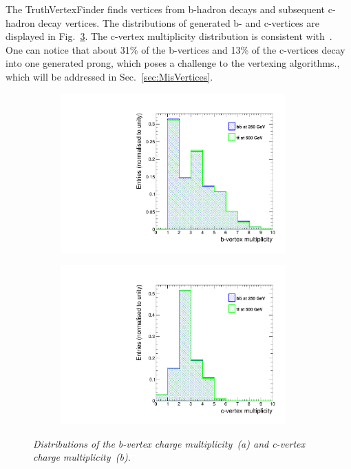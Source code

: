 The TruthVertexFinder finds vertices from b-hadron decays and subsequent c-hadron decay vertices. The distributions of generated b- and c-vertices are displayed in Fig.~\ref{fig:GenVtx_3}. The c-vertex multiplicity distribution is consistent with~\cite{bib:PDG}. One can notice that about 31\% of the b-vertices and 13\% of the c-vertices decay into one generated prong, which poses a challenge to the vertexing algorithms., which will be addressed in Sec.~\ref{sec:MisVertices}.

\begin{figure}
\centering
\begin{subfigure}{0.5\textwidth}
    \includegraphics[width=0.95\textwidth]{ILD/plots/gen-b-vtx.pdf}
\caption{\label{fig:GenVtx_a_3} }
\end{subfigure}%
  \begin{subfigure}{0.5\textwidth}
\centering
    \includegraphics[width=0.95\textwidth]{ILD/plots/gen-c-vtx.pdf}
\caption{\label{fig:GenVtx_b_3} }
\end{subfigure}
    \caption{\sl Distributions of the b-vertex charge multiplicity~(a) and c-vertex charge multiplicity~(b). }
    \label{fig:GenVtx_3}
\end{figure}


